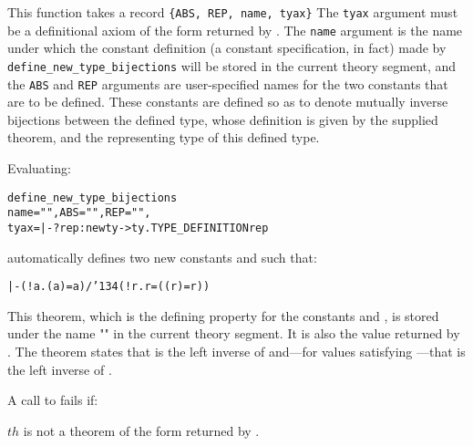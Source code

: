 \noindent This function takes a record {\small\verb+{ABS, REP, name, tyax}+}
The {\verb+tyax+} argument must be a definitional axiom of the form returned by
.  The {\verb+name+} argument is the name under which
the constant definition (a constant specification, in fact) made by
{\small\verb!define_new_type_bijections!} will be stored in the current theory
segment, and the {\small\verb+ABS+} and {\small\verb+REP+} arguments
are user-specified names for the two constants that are to be
defined. These constants are defined so as to denote mutually inverse
bijections between the defined type, whose definition is given by the
supplied theorem, and the representing type of this defined
type.

Evaluating:

\medskip
{\def\op{{\normalsize\sl op}}
\begin{hol}\begin{alltt}
  define\_new\_type\_bijections
       \lb{}name="", ABS="", REP="",
        tyax = |- ?rep:newty->ty. TYPE\_DEFINITION  rep\rb{}
\end{alltt}\end{hol}}

\medskip

\noindent automatically defines two new constants
 and 
such that:

{\def\bk{\char'134}
\begin{hol}\begin{alltt}
   |- (!a. ( a) = a) /\bk (!r.  r = (( r) = r))
\end{alltt}\end{hol}}

\noindent This theorem, which is the defining property for the constants
 and , is stored under the name "" in the current theory
segment.  It is also the value returned by .
The theorem states that  is the left inverse of  and---for
values satisfying ---that  is the left inverse of .

A call to
fails if:

\begin{myenumerate}
\item $th$ is not a theorem of the form returned by
.
\end{myenumerate}%

